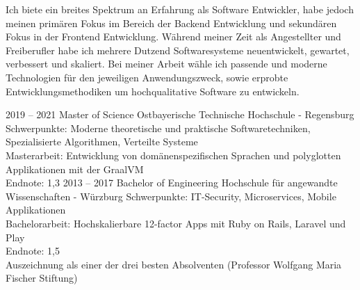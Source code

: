 \documentclass[9pt]{../developercv} %
\begin{document}
\vspace{0.5cm}



\begin{minipage}[t]{0.4\textwidth} %
	\vspace{-\baselineskip} %
        Ich biete ein breites Spektrum an Erfahrung als Software Entwickler, habe jedoch meinen primären
        Fokus im Bereich der Backend Entwicklung und sekundären Fokus in der Frontend Entwicklung.
        Während meiner Zeit als Angestellter und Freiberufler habe ich mehrere Dutzend
        Softwaresysteme neuentwickelt, gewartet, verbessert und skaliert. Bei meiner Arbeit wähle ich
        passende und moderne Technologien für den jeweiligen Anwendungszweck, sowie erprobte Entwicklungsmethodiken
        um hochqualitative Software zu entwickeln.
\end{minipage}
\hfill %
\begin{minipage}[t]{0.55\textwidth} %
	\vspace{-\baselineskip} %
	\begin{barchart}{5.5}
	\end{barchart}
\end{minipage}



\begin{entrylist}
	\entry
		{2019 -- 2021}
		{Master of Science}
		{Ostbayerische Technische Hochschule - Regensburg}
		{Schwerpunkte: Moderne theoretische und praktische Softwaretechniken, Spezialisierte Algorithmen, Verteilte Systeme\\Masterarbeit: Entwicklung von domänenspezifischen Sprachen und polyglotten Applikationen mit der GraalVM\\Endnote: 1,3}
	\entry
		{2013 -- 2017}
		{Bachelor of Engineering}
		{Hochschule für angewandte Wissenschaften - Würzburg}
		{Schwerpunkte: IT-Security, Microservices, Mobile Applikationen\\Bachelorarbeit: Hochskalierbare 12-factor Apps mit Ruby on Rails, Laravel und Play\\Endnote: 1,5\\Auszeichnung als einer der drei besten Absolventen (Professor Wolfgang Maria Fischer Stiftung)}
\end{entrylist}
\end{document}
